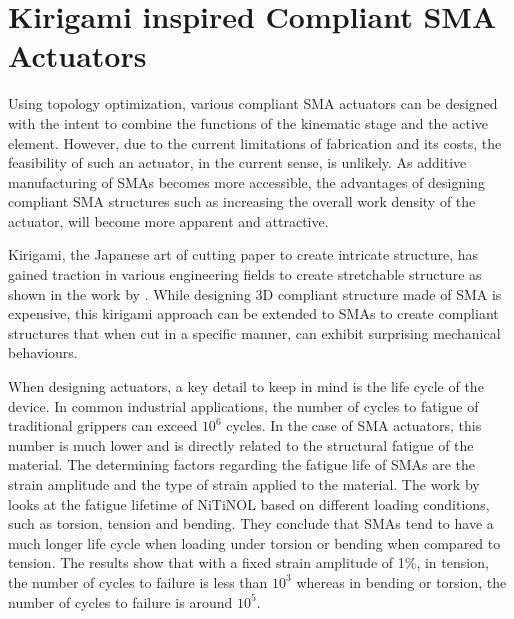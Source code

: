 
\section{Kirigami inspired Compliant SMA Actuators}
Using topology optimization, various compliant SMA actuators can be designed with the intent to combine the functions of the kinematic stage and the active element. However, due to the current limitations of fabrication and its costs, the feasibility of such an actuator, in the current sense, is unlikely. As additive manufacturing of SMAs becomes more accessible, the advantages of designing compliant SMA structures such as increasing the overall work density of the actuator, will become more apparent and attractive.

Kirigami, the Japanese art of cutting paper to create intricate structure, has gained traction in various engineering fields to create stretchable structure as shown in the work by \cite{tangProgrammableKiriKirigamiMetamaterials2017}. While designing 3D compliant structure made of SMA is expensive, this kirigami approach can be extended to SMAs to create compliant structures that when cut in a specific manner, can exhibit surprising mechanical behaviours.

When designing actuators, a key detail to keep in mind is the life cycle of the device. In common industrial applications, the number of cycles to fatigue of traditional grippers can exceed $10^6$ cycles. In the case of SMA actuators, this number is much lower and is directly related to the structural fatigue of the material. The determining factors regarding the fatigue life of SMAs are the strain amplitude and the type of strain applied to the material. The work by \cite{runcimanEquivalentStrainCoffin2011} looks at the fatigue lifetime of NiTiNOL based on different loading conditions, such as torsion, tension and bending. They conclude that SMAs tend to have a much longer life cycle when loading under torsion or bending when compared to tension. The results show that with a fixed strain amplitude of 1\%, in tension, the number of cycles to failure is less than $10^3$ whereas in bending or torsion, the number of cycles to failure is around $10^5$.

